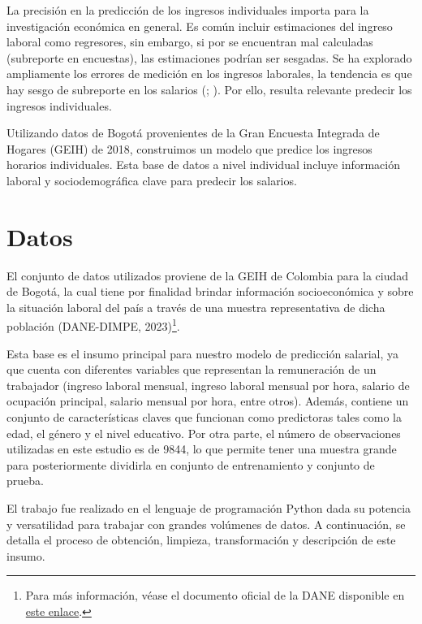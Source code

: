 \documentclass[11pt,oneside]{article}
\begin{document}
	La precisión en la predicción de los ingresos individuales importa para la investigación económica en general. Es común incluir estimaciones del ingreso laboral como regresores, sin embargo, si por se encuentran mal calculadas (subreporte en encuestas), las estimaciones podrían ser sesgadas. Se ha explorado ampliamente los errores de medición en los ingresos laborales, la tendencia es que hay sesgo de subreporte en los salarios (\citealp{moore2000income}; \citealp{bound2001measurement}). Por ello, resulta relevante predecir los ingresos individuales. 
	
	Utilizando datos de Bogotá provenientes de la Gran Encuesta Integrada de Hogares (GEIH) de 2018, construimos un modelo que predice los ingresos horarios individuales. Esta base de datos a nivel individual incluye información laboral y sociodemográfica clave para predecir los salarios.
	

	\section{Datos}
	
	El conjunto de datos utilizados proviene de la GEIH de Colombia para la ciudad de Bogotá, la cual tiene por finalidad brindar información socioeconómica y sobre la situación laboral del país a través de una muestra representativa de dicha población (DANE-DIMPE, 2023)\footnote{Para más información, véase el documento oficial de la DANE disponible en \href{https://ignaciomsarmiento.github.io/GEIH2018_sample/ddi-documentation-spanish-608.pdf}{este enlace}.}.

	
	Esta base es el insumo principal para nuestro modelo de predicción salarial, ya que cuenta con diferentes variables que representan la remuneración de un trabajador (ingreso laboral mensual, ingreso laboral mensual por hora, salario de ocupación principal, salario mensual por hora, entre otros). Además, contiene un conjunto de características claves que funcionan como predictoras tales como la edad, el género y el nivel educativo. Por otra parte, el número de observaciones utilizadas en este estudio es de 9844, lo que permite tener una muestra grande para posteriormente dividirla en conjunto de entrenamiento y conjunto de prueba. 
	
	El trabajo fue realizado en el lenguaje de programación Python dada su potencia y versatilidad para trabajar con grandes volúmenes de datos. A continuación, se detalla el proceso de obtención, limpieza, transformación y descripción de este insumo. 
	
\end{document}
